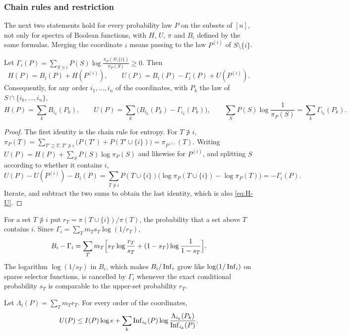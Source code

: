 \subsubsection*{Chain rules and restriction}
The next two statements hold for every probability law $P$ on the subsets of $[n]$, not only for spectra of Boolean functions, with $H$, $U$, $\pi$ and $B_i$ defined by the same formulas. Merging the coordinate $i$ means passing to the law $P^{(i)}$ of $S\setminus\{i\}$.

\begin{proposition}\label{prop:chain}
Let $\Gamma_i(P)=\sum_{S\ni i}P(S)\log\frac{\pi_P(S\setminus\{i\})}{\pi_P(S)}\ge0$. Then
\[
H(P)=B_i(P)+H(P^{(i)}),\qquad U(P)=B_i(P)-\Gamma_i(P)+U(P^{(i)}).
\]
Consequently, for any order $i_1,\dots,i_n$ of the coordinates, with $P_k$ the law of $S\cap\{i_k,\dots,i_n\}$,
\[
H(P)=\sum_kB_{i_k}(P_k),\qquad U(P)=\sum_k\bigl(B_{i_k}(P_k)-\Gamma_{i_k}(P_k)\bigr),\qquad \sum_SP(S)\log\frac1{\pi_P(S)}=\sum_k\Gamma_{i_k}(P_k).
\]
\end{proposition}

\begin{proof}
The first identity is the chain rule for entropy. For $T\not\ni i$, $\pi_P(T)=\sum_{T'\supseteq T,\,T'\not\ni i}\bigl(P(T')+P(T'\cup\{i\})\bigr)=\pi_{P^{(i)}}(T)$. Writing $U(P)=H(P)+\sum_SP(S)\log\pi_P(S)$ and likewise for $P^{(i)}$, and splitting $S$ according to whether it contains $i$,
\[
U(P)-U(P^{(i)})-B_i(P)=\sum_{T\not\ni i}P(T\cup\{i\})\bigl(\log\pi_P(T\cup\{i\})-\log\pi_P(T)\bigr)=-\Gamma_i(P).
\]
Iterate, and subtract the two sums to obtain the last identity, which is also \eqref{eq:H-U}.
\end{proof}

For a set $T\not\ni i$ put $r_T=\pi(T\cup\{i\})/\pi(T)$, the probability that a set above $T$ contains $i$. Since $\Gamma_i=\sum_Tm_Ts_T\log(1/r_T)$,
\begin{equation}\label{eq:BminusGamma}
B_i-\Gamma_i=\sum_Tm_T\Bigl[s_T\log\frac{r_T}{s_T}+(1-s_T)\log\frac1{1-s_T}\Bigr].
\end{equation}
The logarithm $\log(1/s_T)$ in $B_i$, which makes $B_i/\operatorname{Inf}_i$ grow like $\log(1/\operatorname{Inf}_i)$ on sparse selector functions, is cancelled by $\Gamma_i$ whenever the exact conditional probability $s_T$ is comparable to the upper-set probability $r_T$.

\begin{proposition}\label{prop:lift}
Let $\Lambda_i(P)=\sum_Tm_Tr_T$. For every order of the coordinates,
\[
U(P)\le I(P)\log e+\sum_k\operatorname{Inf}_{i_k}(P)\log\frac{\Lambda_{i_k}(P_k)}{\operatorname{Inf}_{i_k}(P)}.
\]
\end{proposition}

